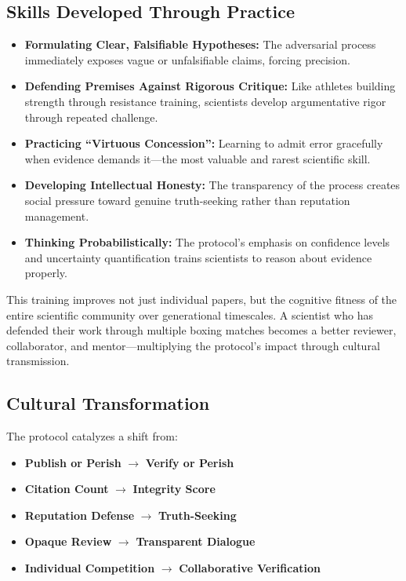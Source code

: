 \documentclass[11pt,a4paper]{article}
\begin{document}
\subsection{Skills Developed Through Practice}
\begin{itemize}[nosep]
    \item \textbf{Formulating Clear, Falsifiable Hypotheses:} The adversarial process immediately exposes vague or unfalsifiable claims, forcing precision.
    
    \item \textbf{Defending Premises Against Rigorous Critique:} Like athletes building strength through resistance training, scientists develop argumentative rigor through repeated challenge.
    
    \item \textbf{Practicing ``Virtuous Concession'':} Learning to admit error gracefully when evidence demands it—the most valuable and rarest scientific skill.
    
    \item \textbf{Developing Intellectual Honesty:} The transparency of the process creates social pressure toward genuine truth-seeking rather than reputation management.
    
    \item \textbf{Thinking Probabilistically:} The protocol's emphasis on confidence levels and uncertainty quantification trains scientists to reason about evidence properly.
\end{itemize}

This training improves not just individual papers, but the cognitive fitness of the entire scientific community over generational timescales. A scientist who has defended their work through multiple boxing matches becomes a better reviewer, collaborator, and mentor—multiplying the protocol's impact through cultural transmission.

\subsection{Cultural Transformation}
The protocol catalyzes a shift from:
\begin{itemize}[nosep]
    \item \textbf{Publish or Perish} $\rightarrow$ \textbf{Verify or Perish}
    \item \textbf{Citation Count} $\rightarrow$ \textbf{Integrity Score}
    \item \textbf{Reputation Defense} $\rightarrow$ \textbf{Truth-Seeking}
    \item \textbf{Opaque Review} $\rightarrow$ \textbf{Transparent Dialogue}
    \item \textbf{Individual Competition} $\rightarrow$ \textbf{Collaborative Verification}
\end{itemize}
\end{document}
